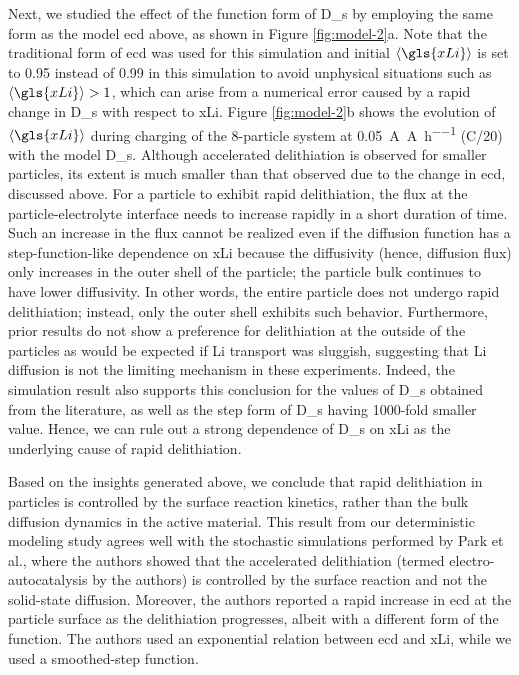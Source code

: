 \documentclass{article}
\begin{document}
Next, we studied the effect of the function form of \gls{D_s} by
employing the same form as the model \gls{ecd} above, as shown in
Figure \ref{fig:model-2}a. Note that the traditional form of \gls{ecd}
was used for this simulation and initial $\left\langle \gls{xLi}
\right\rangle$ is set to \num{0.95} instead of \num{0.99} in this
simulation to avoid unphysical situations such as $\left\langle
\gls{xLi} \right\rangle > 1$, which can arise from a numerical error
caused by a rapid change in \gls{D_s} with respect to
\gls{xLi}. Figure \ref{fig:model-2}b shows the evolution of
$\left\langle \gls{xLi} \right\rangle$ during charging of the
8-particle system at \SI{0.05}{\ampere\per\ampere\per\hour} (C/20) with
the model \gls{D_s}. Although accelerated delithiation is observed for
smaller particles, its extent is much smaller than that observed due
to the change in \gls{ecd}, discussed above. For a particle to exhibit
rapid delithiation, the flux at the particle-electrolyte interface
needs to increase rapidly in a short duration of time. Such an
increase in the flux cannot be realized even if the diffusion function
has a step-function-like dependence on \gls{xLi} because the
diffusivity (hence, diffusion flux) only increases in the outer shell
of the particle; the particle bulk continues to have lower
diffusivity. In other words, the entire particle does not undergo
rapid delithiation; instead, only the outer shell exhibits such
behavior. Furthermore, prior results do not show a preference for
delithiation at the outside of the particles\cite{lu2021} as would be
expected if Li transport was sluggish, suggesting that Li diffusion is
not the limiting mechanism in these experiments. Indeed, the
simulation result also supports this conclusion for the values of
\gls{D_s} obtained from the literature, as well as the step form of
\gls{D_s} having 1000-fold smaller value. Hence, we can rule out a
strong dependence of \gls{D_s} on \gls{xLi} as the underlying cause of
rapid delithiation.

Based on the insights generated above, we conclude that rapid
delithiation in \nca{} particles is controlled by the surface reaction
kinetics, rather than the bulk  diffusion dynamics in the
active material. This result from our deterministic modeling study
agrees well with the stochastic simulations performed by Park et
al.\cite{chueh2021}, where the authors showed that the accelerated
delithiation (termed electro-autocatalysis by the authors) is
controlled by the surface reaction and not the solid-state
diffusion. Moreover, the authors reported a rapid increase in
\gls{ecd} at the \nca{} particle surface as the delithiation
progresses, albeit with a different form of the function. The authors
used an exponential relation between \gls{ecd} and \gls{xLi}, while we
used a smoothed-step function.
\end{document}

